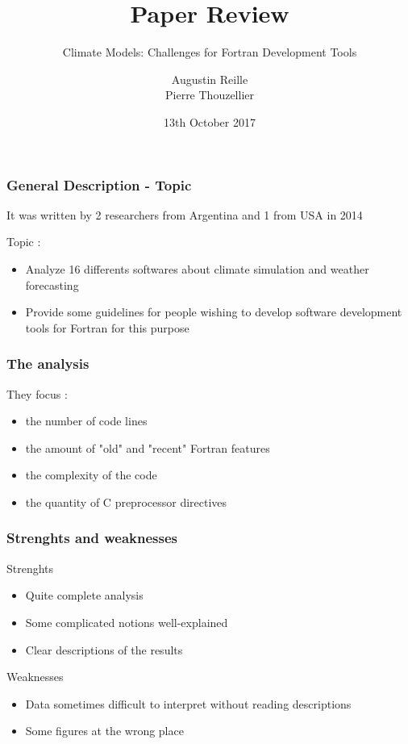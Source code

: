 \documentclass{beamer}
\title{Paper Review}
\subtitle{Climate Models: Challenges for Fortran Development Tools}
\author{Augustin Reille\\Pierre Thouzellier}
\institute{SETC\\ University of Cranfield}
\date{13th October 2017}
\begin{document}
    \begin{frame}
        \titlepage
    \end{frame}
    
    \begin{frame}
        \frametitle{General Description - Topic}
        It was written by 2 researchers from Argentina and 1 from USA in 2014
        \begin{block}{Topic :}
            \begin{itemize}
                \item<1-> Analyze 16 differents softwares about climate simulation and weather forecasting %
                \item<1-> Provide some guidelines for people wishing to develop software development tools for Fortran for this purpose 
            \end{itemize}
        \end{block}
    \end{frame}
    \begin{frame}
        \frametitle{The analysis}
        \begin{block}{They focus :}
            \begin{itemize}
                \item<1-> the number of code lines
                \item<1-> the amount of "old" and "recent" Fortran features
                \item<1-> the complexity of the code
                \item<1-> the quantity of C preprocessor directives
            \end{itemize}
        \end{block}
    \end{frame}

    \begin{frame}
        \frametitle{Strenghts and weaknesses}
        \begin{block}{Strenghts}
            \begin{itemize}
                \item Quite complete analysis
                \item Some complicated notions well-explained
                \item Clear descriptions of the results
            \end{itemize}
        \end{block}
        \begin{block}{Weaknesses}
            \begin{itemize}
                \item Data sometimes difficult to interpret without reading descriptions
                \item Some figures at the wrong place
            \end{itemize}
        \end{block}
    \end{frame}
\end{document}
